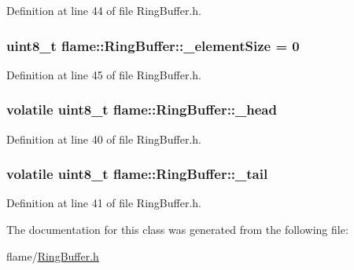 Definition at line 44 of file Ring\-Buffer.\-h.

\hypertarget{classflame_1_1_ring_buffer_a96a3712379a390f16b4ab5a838e794a3}{
\subsubsection[{\-\_\-element\-Size}]{\setlength{\rightskip}{0pt plus 5cm}uint8\-\_\-t flame\-::\-Ring\-Buffer\-::\-\_\-element\-Size = 0\hspace{0.3cm}{\ttfamily [protected]}}}\label{classflame_1_1_ring_buffer_a96a3712379a390f16b4ab5a838e794a3}


Definition at line 45 of file Ring\-Buffer.\-h.

\hypertarget{classflame_1_1_ring_buffer_af8a6c82581a2a8f62373d43f9f974402}{
\subsubsection[{\-\_\-head}]{\setlength{\rightskip}{0pt plus 5cm}volatile uint8\-\_\-t flame\-::\-Ring\-Buffer\-::\-\_\-head\hspace{0.3cm}{\ttfamily [protected]}}}\label{classflame_1_1_ring_buffer_af8a6c82581a2a8f62373d43f9f974402}


Definition at line 40 of file Ring\-Buffer.\-h.

\hypertarget{classflame_1_1_ring_buffer_a57382fd37f090fdd43b0c7e0e7f8246d}{
\subsubsection[{\-\_\-tail}]{\setlength{\rightskip}{0pt plus 5cm}volatile uint8\-\_\-t flame\-::\-Ring\-Buffer\-::\-\_\-tail\hspace{0.3cm}{\ttfamily [protected]}}}\label{classflame_1_1_ring_buffer_a57382fd37f090fdd43b0c7e0e7f8246d}


Definition at line 41 of file Ring\-Buffer.\-h.



The documentation for this class was generated from the following file\-:\begin{DoxyCompactItemize}
\item 
flame/\hyperlink{_ring_buffer_8h}{Ring\-Buffer.\-h}\end{DoxyCompactItemize}

